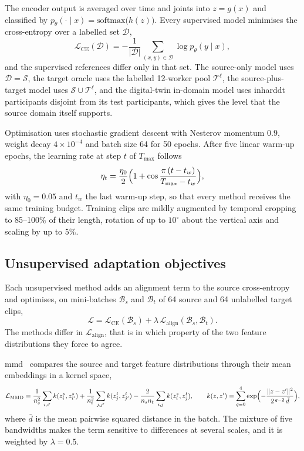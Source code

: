 \documentclass[3p,times,procedia]{elsarticle}
\begin{document}
The encoder output is averaged over time and joints into $z=g(x)$ and
classified by $p_\theta(\cdot\mid x)=\mathrm{softmax}\bigl(h(z)\bigr)$. Every
supervised model minimises the cross-entropy over a labelled set $\mathcal{D}$,
\begin{equation}
  \mathcal{L}_{\mathrm{CE}}(\mathcal{D})=-\frac{1}{|\mathcal{D}|}
  \sum_{(x,y)\in\mathcal{D}}\log p_\theta(y\mid x),
  \label{eq:ce}
\end{equation}
and the supervised references differ only in that set. The source-only model
uses $\mathcal{D}=\mathcal{S}$, the target oracle uses the labelled 12-worker
pool $\mathcal{T}^{\ell}$, the source-plus-target model uses
$\mathcal{S}\cup\mathcal{T}^{\ell}$, and the digital-twin in-domain model uses
\acs{inharddt} participants disjoint from its test participants, which gives
the level that the source domain itself supports.

Optimisation uses stochastic gradient descent with Nesterov momentum $0.9$,
weight decay $4\times10^{-4}$ and batch size 64 for 50 epochs. After five
linear warm-up epochs, the learning rate at step $t$ of $T_{\max}$ follows
\begin{equation}
  \eta_t=\frac{\eta_0}{2}\Bigl(1+\cos\frac{\pi\,(t-t_w)}{T_{\max}-t_w}\Bigr),
  \label{eq:lr}
\end{equation}
with $\eta_0=0.05$ and $t_w$ the last warm-up step, so that every method
receives the same training budget. Training clips are mildly augmented by
temporal cropping to 85--100\% of their length, rotation of up to $10^\circ$
about the vertical axis and scaling by up to 5\%.

\subsection{Unsupervised adaptation objectives}

Each unsupervised method adds an alignment term to the source cross-entropy and
optimises, on mini-batches $\mathcal{B}_s$ and $\mathcal{B}_t$ of 64 source and
64 unlabelled target clips,
\begin{equation}
  \mathcal{L}=\mathcal{L}_{\mathrm{CE}}(\mathcal{B}_s)
  +\lambda\,\mathcal{L}_{\mathrm{align}}(\mathcal{B}_s,\mathcal{B}_t).
  \label{eq:uda}
\end{equation}
The methods differ in $\mathcal{L}_{\mathrm{align}}$, that is in which property
of the two feature distributions they force to agree.

\ac{mmd}~\cite{long2015dan} compares the source and target feature
distributions through their mean embeddings in a kernel space,
\begin{equation}
  \mathcal{L}_{\mathrm{MMD}}=\frac{1}{n_s^2}\sum_{i,i'}k(z_i^s,z_{i'}^s)
  +\frac{1}{n_t^2}\sum_{j,j'}k(z_j^t,z_{j'}^t)
  -\frac{2}{n_sn_t}\sum_{i,j}k(z_i^s,z_j^t),\qquad
  k(z,z')=\sum_{q=0}^{4}\exp\Bigl(-\frac{\|z-z'\|^2}{2^{\,q-2}\,\bar{d}}\Bigr),
  \label{eq:mmd}
\end{equation}
where $\bar{d}$ is the mean pairwise squared distance in the batch. The mixture
of five bandwidths makes the term sensitive to differences at several scales,
and it is weighted by $\lambda=0.5$.
\end{document}
